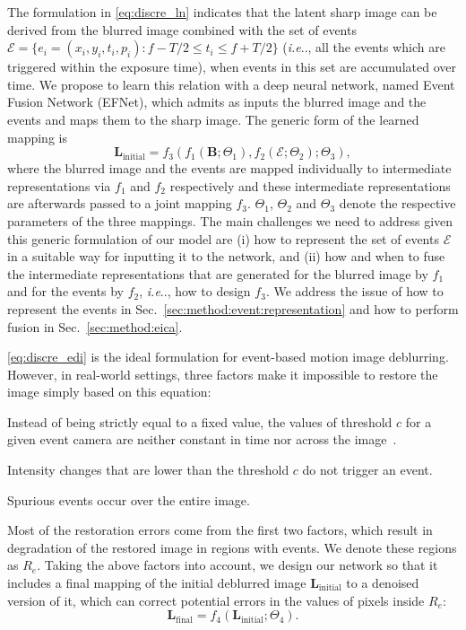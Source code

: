 \documentclass[runningheads]{llncs}
\makeatletter
\newcommand{\vB}{\mathbf{B}}
\newcommand{\vL}{\mathbf{L}}
\DeclareRobustCommand\onedot{\futurelet\@let@token\@onedot}
\def\@onedot{\ifx\@let@token.\else.\null\fi\xspace}
\def\ie{\emph{i.e}\onedot} \def\Ie{\emph{I.e}\onedot}
\newlength \g
\makeatother
\begin{document}
The formulation in \eqref{eq:discre_ln} indicates that the latent sharp image can be derived from the blurred image combined with the set of events $\mathcal{E} = \{e_i = (x_i, y_i, t_i, p_i): f - T/2 \leq t_i \leq f + T/2\}$ (\ie, all the events which are triggered within the exposure time), when events in this set are accumulated over time. We propose to learn this relation with a deep neural network, named Event Fusion Network (EFNet), which admits as inputs the blurred image and the events and maps them to the sharp image. The generic form of the learned mapping is
\begin{equation}
\label{eq:simplify_deblur_1}
    \vL_{\text{initial}} = f_3\left(f_{1}(\vB; \Theta_{1}), f_{2}(\mathcal{E};\Theta_{2}); \Theta_3\right),
\end{equation}
where the blurred image and the events are mapped individually to intermediate representations via $f_1$ and $f_2$ respectively and these intermediate representations are afterwards passed to a joint mapping $f_3$. $\Theta_1$, $\Theta_2$ and $\Theta_3$ denote the respective parameters of the three mappings. The main challenges we need to address given this generic formulation of our model are (i) how to represent the set of events $\mathcal{E}$ in a suitable way for inputting it to the network, and (ii) how and when to fuse the intermediate representations that are generated for the blurred image by $f_1$ and for the events by $f_2$, \ie, how to design $f_3$. We address the issue of how to represent the events in Sec.~\ref{sec:method:event:representation} and how to perform fusion in Sec.~\ref{sec:method:eica}.

\eqref{eq:discre_edi} is the ideal formulation for event-based motion image deblurring. However, in real-world settings, three factors make it impossible to restore the image simply based on this equation:


\begin{compactitem}
    \item{Instead of being strictly equal to a fixed value, the values of threshold $c$ for a given event camera are neither constant in time nor across the image~\cite{stoffregen2020reducing,wang19acra}}.
    \item{Intensity changes that are lower than the threshold $c$ do not trigger an event.}
    \item{Spurious events occur over the entire image.}
\end{compactitem}

Most of the restoration errors come from the first two factors, which result in degradation of the restored image in regions with events. We denote these regions as $R_e$.
Taking the above factors into account, we design our network so that it includes a final mapping  of the initial deblurred image $\vL_{\text{initial}}$ to a denoised version of it, which can correct potential errors in the values of pixels inside $R_e$:
\begin{equation}
\label{eq:simplify_deblur_2}
    \vL_{\text{final}} = f_4(\vL_{\text{initial}};\Theta_4).
\end{equation}
\end{document}
